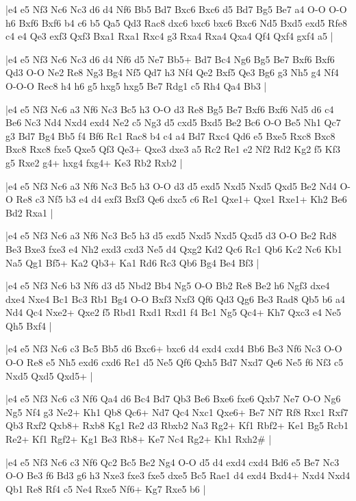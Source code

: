 \whitename{}
\blackname{}
\makegametitle
|e4 e5 Nf3 Nc6 Nc3 d6 d4 Nf6 Bb5 Bd7 Bxc6 Bxc6 d5 Bd7 Bg5 Be7 a4 O-O O-O h6 Bxf6 Bxf6 b4 c6 b5 Qa5 Qd3 Rac8 dxc6 bxc6 bxc6 Bxc6 Nd5 Bxd5 exd5 Rfe8 c4 e4 Qe3 exf3 Qxf3 Bxa1 Rxa1 Rxc4 g3 Rxa4 Rxa4 Qxa4 Qf4 Qxf4 gxf4 a5  |

\whitename{}
\blackname{}
\makegametitle
|e4 e5 Nf3 Nc6 Nc3 d6 d4 Nf6 d5 Ne7 Bb5+ Bd7 Bc4 Ng6 Bg5 Be7 Bxf6 Bxf6 Qd3 O-O Ne2 Re8 Ng3 Bg4 Nf5 Qd7 h3 Nf4 Qe2 Bxf5 Qe3 Bg6 g3 Nh5 g4 Nf4 O-O-O Rec8 h4 h6 g5 hxg5 hxg5 Be7 Rdg1 c5 Rh4 Qa4 Bb3  |

\whitename{}
\blackname{}
\makegametitle
|e4 e5 Nf3 Nc6 a3 Nf6 Nc3 Bc5 h3 O-O d3 Re8 Bg5 Be7 Bxf6 Bxf6 Nd5 d6 c4 Be6 Nc3 Nd4 Nxd4 exd4 Ne2 c5 Ng3 d5 cxd5 Bxd5 Be2 Bc6 O-O Be5 Nh1 Qc7 g3 Bd7 Bg4 Bb5 f4 Bf6 Rc1 Rac8 b4 c4 a4 Bd7 Rxc4 Qd6 e5 Bxe5 Rxc8 Bxc8 Bxc8 Rxc8 fxe5 Qxe5 Qf3 Qe3+ Qxe3 dxe3 a5 Rc2 Re1 e2 Nf2 Rd2 Kg2 f5 Kf3 g5 Rxe2 g4+ hxg4 fxg4+ Ke3 Rb2 Rxb2  |

\whitename{}
\blackname{}
\makegametitle
|e4 e5 Nf3 Nc6 a3 Nf6 Nc3 Bc5 h3 O-O d3 d5 exd5 Nxd5 Nxd5 Qxd5 Be2 Nd4 O-O Re8 c3 Nf5 b3 e4 d4 exf3 Bxf3 Qe6 dxc5 c6 Re1 Qxe1+ Qxe1 Rxe1+ Kh2 Be6 Bd2 Rxa1  |

\whitename{}
\blackname{}
\makegametitle
|e4 e5 Nf3 Nc6 a3 Nf6 Nc3 Bc5 h3 d5 exd5 Nxd5 Nxd5 Qxd5 d3 O-O Be2 Rd8 Be3 Bxe3 fxe3 e4 Nh2 exd3 cxd3 Ne5 d4 Qxg2 Kd2 Qc6 Rc1 Qb6 Kc2 Nc6 Kb1 Na5 Qg1 Bf5+ Ka2 Qb3+ Ka1 Rd6 Rc3 Qb6 Bg4 Be4 Bf3  |

\whitename{}
\blackname{}
\makegametitle
|e4 e5 Nf3 Nc6 b3 Nf6 d3 d5 Nbd2 Bb4 Ng5 O-O Bb2 Re8 Be2 h6 Ngf3 dxe4 dxe4 Nxe4 Bc1 Bc3 Rb1 Bg4 O-O Bxf3 Nxf3 Qf6 Qd3 Qg6 Be3 Rad8 Qb5 b6 a4 Nd4 Qc4 Nxe2+ Qxe2 f5 Rbd1 Rxd1 Rxd1 f4 Bc1 Ng5 Qc4+ Kh7 Qxc3 e4 Ne5 Qh5 Bxf4  |

\whitename{}
\blackname{}
\makegametitle
|e4 e5 Nf3 Nc6 c3 Bc5 Bb5 d6 Bxc6+ bxc6 d4 exd4 cxd4 Bb6 Be3 Nf6 Nc3 O-O O-O Re8 e5 Nh5 exd6 cxd6 Re1 d5 Ne5 Qf6 Qxh5 Bd7 Nxd7 Qe6 Ne5 f6 Nf3 c5 Nxd5 Qxd5 Qxd5+  |

\whitename{}
\blackname{}
\makegametitle
|e4 e5 Nf3 Nc6 c3 Nf6 Qa4 d6 Bc4 Bd7 Qb3 Be6 Bxe6 fxe6 Qxb7 Ne7 O-O Ng6 Ng5 Nf4 g3 Ne2+ Kh1 Qb8 Qc6+ Nd7 Qc4 Nxc1 Qxe6+ Be7 Nf7 Rf8 Rxc1 Rxf7 Qb3 Rxf2 Qxb8+ Rxb8 Kg1 Re2 d3 Rbxb2 Na3 Rg2+ Kf1 Rbf2+ Ke1 Bg5 Rcb1 Re2+ Kf1 Rgf2+ Kg1 Be3 Rb8+ Ke7 Nc4 Rg2+ Kh1 Rxh2\#  |

\whitename{}
\blackname{}
\makegametitle
|e4 e5 Nf3 Nc6 c3 Nf6 Qc2 Bc5 Be2 Ng4 O-O d5 d4 exd4 cxd4 Bd6 e5 Be7 Nc3 O-O Be3 f6 Bd3 g6 h3 Nxe3 fxe3 fxe5 dxe5 Bc5 Rae1 d4 exd4 Bxd4+ Nxd4 Nxd4 Qb1 Re8 Rf4 c5 Ne4 Rxe5 Nf6+ Kg7 Rxe5 b6  |


